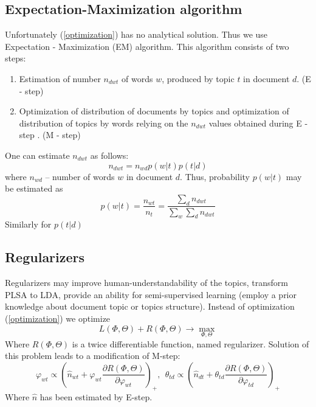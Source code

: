     \subsection{Expectation\--Maximization algorithm} \label{EMAlgorithm}
	    Unfortunately (\ref{optimization}) has no analytical solution. Thus we use Expectation \-- Maximization (EM) algorithm.
	    This algorithm consists of two steps:
	    \begin{enumerate}
		\item Estimation of number $n_{dwt}$ of words $w$, produced by topic $t$ in document $d$. (E \-- step)
		\item Optimization of distribution of documents by topics and optimization of distribution of topics by words relying on
		    the $n_{dwt}$ values obtained during E \-- step . (M \-- step)
	    \end{enumerate}
	    One can estimate $n_{dwt}$ as follows:
	    \begin{equation}  n_{dwt} = n_{wd} p(w|t) p(t|d) \end{equation}
	    where $n_{wd}$ \--- number of words $w$ in document $d$.
	    Thus, probability $p(w|t)$ may be estimated as
	    \begin{equation}  p(w|t) = \frac{n_{wt}}{n_t} = \frac{\sum_d n_{dwt} }{\sum_w \sum_d n_{dwt}}   \end{equation}
	    Similarly for $p(t|d)$

    \subsection{Regularizers} \label{Regularizers}
	Regularizers may improve human-understandability of the topics, transform PLSA to LDA, provide an ability
	for semi-supervised learning (employ a prior knowledge about document topic or topics structure).
	Instead of optimization (\ref{optimization}) we optimize
	\begin{equation} \label{optimizeWithReqularizer} L(\Phi, \Theta) + R(\Phi, \Theta) \to \max_{\Phi, \Theta} \end{equation}
	Where $R(\Phi, \Theta)$ is a twice differentiable function, named regularizer.
	Solution of this problem leads to a modification of M\--step:
	\begin{equation}
	    \label{RegularizersEquation}
	    \varphi_{wt} \propto \left(\hat{n}_{wt} + \varphi_{wt} \frac{\partial  R(\Phi, \Theta)}{\partial \varphi_{wt}} \right)_+ ,\ \
	    \theta_{td} \propto \left(\hat{n}_{dt} + \theta_{td}\frac{\partial  R(\Phi, \Theta)}{\partial \varphi_{td}} \right)_+
	\end{equation}
	Where $\hat{n}$ has been estimated by E\--step.
